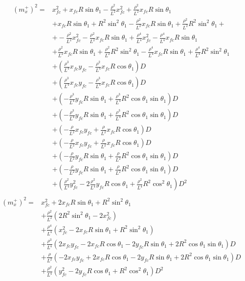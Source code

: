 \documentclass[12pt]{article}
\begin{document}
\begin{align}
    (m^+_x)^2=& x_{fc}^2 +x_{fc}R\sin\theta_1 -\frac{\rho^2}{L^2}x_{fc}^2 + \frac{\rho^2}{L^2}x_{fc}R\sin\theta_1 \nonumber\\
    &+ x_{fc}R\sin\theta_1 +R^2\sin^2\theta_1 -\frac{\rho^2}{L^2}x_{fc}R\sin\theta_1 + \frac{\rho^2}{L^2}R^2\sin^2\theta_1 + \nonumber\\
    &+ -\frac{\rho^2}{L^2}x_{fc}^2  -\frac{\rho^2}{L^2}x_{fc}R\sin\theta_1 +\frac{\rho^4}{L^4}x_{fc}^2 - \frac{\rho^4}{L^4}x_{fc}R\sin\theta_1 \nonumber\\
    &+ \frac{\rho^2}{L^2}x_{fc}R\sin\theta_1 +\frac{\rho^2}{L^2}R^2\sin^2\theta_1 -\frac{\rho^4}{L^4}x_{fc}R\sin\theta_1 + \frac{\rho^4}{L^4}R^2\sin^2\theta_1 \nonumber\\
    &+ (\frac{\rho^3}{L^4}x_{fc}y_{fc} -\frac{\rho^2}{L^4}x_{fc}R\cos\theta_1)D  \nonumber\\
    &+(\frac{\rho^3}{L^4}x_{fc}y_{fc} -\frac{\rho^3}{L^4}x_{fc}R\cos\theta_1)D \nonumber\\   &+ (-\frac{\rho^3}{L^4}y_{fc}R\sin\theta_1 +\frac{\rho^3}{L^4}R^2\cos\theta_1\sin\theta_1)D \nonumber\\
    &+ (-\frac{\rho^3}{L^4}y_{fc}R\sin\theta_1 +\frac{\rho^3}{L^4}R^2\cos\theta_1\sin\theta_1)D  \nonumber\\
    &+ (-\frac{\rho}{L^2}x_{fc}y_{fc} +\frac{\rho}{L^2}x_{fc}R\cos\theta_1)D \nonumber\\
    &+ (-\frac{\rho}{L^2}x_{fc}y_{fc} +\frac{\rho}{L^2}x_{fc}R\cos\theta_1)D  \nonumber\\
    &+ (-\frac{\rho}{L^2}y_{fc}R\sin\theta_1 +\frac{\rho}{L^2}R^2\cos\theta_1\sin\theta_1)D   \nonumber\\
    &+(-\frac{\rho}{L^2}y_{fc}R\sin\theta_1 +\frac{\rho}{L^2}R^2\cos\theta_1\sin\theta_1)D \nonumber\\
    &+ (\frac{\rho^2}{L^4}y_{fc}^2 -2\frac{\rho^2}{L^4}y_{fc}R\cos\theta_1 +\frac{\rho^2}{L^4}R^2\cos^2\theta_1)D^2 \\
\end{align}
\begin{align}
    (m^+_x)^2=& x_{fc}^2 +2x_{fc}R\sin\theta_1 + R^2\sin^2\theta_1 \nonumber\\
    &+ \frac{\rho^2}{L^2}(2R^2\sin^2\theta_1 -2x_{fc}^2)  \nonumber\\
    &+ \frac{\rho^4}{L^4}(x_{fc}^2 - 2x_{fc}R\sin\theta_1 + R^2\sin^2\theta_1) \nonumber\\
    &+ \frac{\rho^3}{L^4}(2x_{fc}y_{fc} -2x_{fc}R\cos\theta_1  -2y_{fc}R\sin\theta_1 +2R^2\cos\theta_1\sin\theta_1)D  \nonumber\\
    &+ \frac{\rho}{L^2}(-2x_{fc}y_{fc} +2x_{fc}R\cos\theta_1 -2y_{fc}R\sin\theta_1 +2R^2\cos\theta_1\sin\theta_1)D  \nonumber\\
    &+ \frac{\rho^2}{L^4}(y_{fc}^2 -2y_{fc}R\cos\theta_1 +R^2\cos^2\theta_1)D^2
\end{align}
\end{document}

